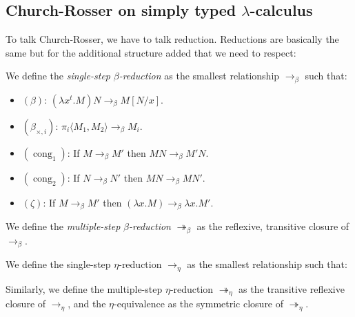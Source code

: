 \subsection{Church-Rosser on simply typed $\lambda$-calculus}

To talk Church-Rosser, we have to talk reduction. Reductions are basically the same but for the additional structure added that we need to respect: 

\begin{definition}
  We define the \emph{single-step} $\beta$\emph{-reduction} as the smallest relationship $\to_\beta$ such that:
\begin{itemize}
\item[]$(\beta)$: $ (\lambda x^t.M)N \to_\beta M[N/x]$.\\
\item[]$(\beta_{\times,i})$: $\pi_i\langle M_1,M_2\rangle \to_\beta M_i$.\\
\item[]$(\operatorname{cong}_1)$: If $ M \to_\beta M'$ then $MN \to_\beta M'N$.\\
\item[]$(\operatorname{cong}_2)$: If $ N \to_\beta N'$ then $ MN \to_\beta MN'$.\\
\item[]$(\zeta)$: If $M\to_\beta M'$ then $(\lambda x.M) \to_\beta \lambda x.M'$.\\
\end{itemize}
We define the \emph{multiple-step} $\beta$\emph{-reduction} $\twoheadrightarrow_\beta$ as the reflexive, transitive closure of $\to_\beta$.
\end{definition}

\begin{definition}
We define the single-step $\eta$-reduction $\to_\eta$ as the smallest relationship such that: 
\begin{itemize}
\item[]$(\eta)$: $(\lambda x.Mx) \to_\eta M}$,para todo $ x \not  \in FV(M)$.\\
\item[]$(\eta_1)$: $\langle\pi_1 M, \pi_2 M\rangle\to_\eta M$.\\
\item[]$(\eta_\times)$: If $M:1$ then $M \to_\eta *$ . \\
\item[]$(\operatorname{cong}_1)$: If $ M \to_\eta M'$ then $MN \to_\eta M'N$.\\
\item[]$(\operatorname{cong}_2)$: If $ N \to_\eta N'$ then $ MN \to_\eta MN'$.\\
\item[]$(\zeta)$: If $M\to_\eta M'$ then $(\lambda x.M) \to_\eta \lambda x.M'$.\\
\end{itemize}

  Similarly, we define the multiple-step $\eta$-reduction $\twoheadrightarrow_\eta$ as the transitive reflexive closure of $\to_\eta$, and the $\eta$-equivalence as the symmetric closure of $\twoheadrightarrow_\eta$.
\end{definition}

